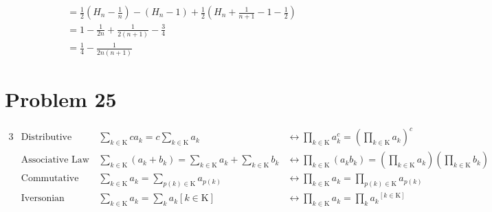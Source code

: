 \begin{align*}
      & =\frac{1}{2}\left(H_n - \frac{1}{n}\right) - \left(H_n-1\right) + \frac{1}{2}\left(H_n + \frac{1}{n+1} - 1 - \frac{1}{2}\right)                                                                                                  \\
      & =1-\frac{1}{2n} + \frac{1}{2(n+1)} - \frac{3}{4}                                                                                                                                                                                 \\
      & =\frac{1}{4}-\frac{1}{2n(n+1)}
\end{align*}

\section*{Problem 25}
\begin{alignat*}{3}
     & \text{Distributive Law}\qquad & \sum_{k \in \mathrm{K}} ca_k = c\sum_{k \in \mathrm{K}} a_k                                    & \longleftrightarrow \prod_{k \in \mathrm{K}}a_k^c = \left(\prod_{k \in \mathrm{K}}a_k\right)^c                                          \\
     & \text{Associative Law}\qquad  & \sum_{k \in \mathrm{K}} (a_k + b_k) = \sum_{k \in \mathrm{K}}a_k + \sum_{k \in \mathrm{K}} b_k & \longleftrightarrow \prod_{k \in \mathrm{K}}(a_kb_k) = \left(\prod_{k \in \mathrm{K}}a_k\right)\left(\prod_{k \in \mathrm{K}}b_k\right) \\
     & \text{Commutative Law}        & \sum_{k \in \mathrm{K}}a_k = \sum_{p(k) \in \mathrm{K}} a_{p(k)}                               & \longleftrightarrow \prod_{k \in \mathrm{K}}a_k = \prod_{p(k) \in \mathrm{K}} a_{p(k)}                                                  \\
     & \text{Iversonian Notation}    & \sum_{k \in \mathrm{K}}a_k = \sum_{k}a_k[k\in \mathrm{K}]                                      & \longleftrightarrow \prod_{k\in \mathrm{K}}a_k = \prod_{k}{a_k}^{[k \in \mathrm{K}]}
\end{alignat*}
\clearpage


